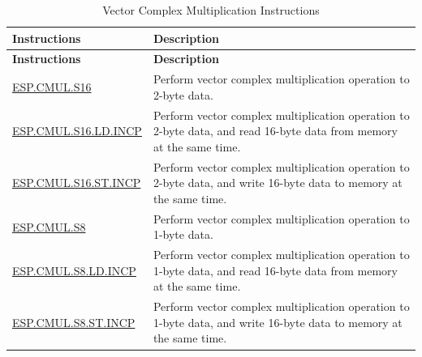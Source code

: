 \begin{longtable}[c]{|l|m{10cm}|}
    \caption{Vector Complex Multiplication Instructions}
    \label{tab:pie-complex-instructions}\\
    \hline
    \rowcolor{lightgray}
    \textbf{Instructions} & \textbf{Description} \\\hline
    \endfirsthead
    \rowcolor{lightgray}
    \textbf{Instructions} & \textbf{Description} \\\hline
    \endhead
    \endfoot
    
    \hyperref[instruction:ESPCMULS16]{ESP.CMUL.S16} & Perform vector complex multiplication operation to 2-byte data.
    \\\hline
    \hyperref[instruction:ESPCMULS16LDINCP]{ESP.CMUL.S16.LD.INCP} & Perform vector complex multiplication operation to 2-byte data, and read 16-byte data from memory at the same time.
    \\\hline
    \hyperref[instruction:ESPCMULS16STINCP]{ESP.CMUL.S16.ST.INCP} & Perform vector complex multiplication operation to 2-byte data, and write 16-byte data to memory at the same time.
    \\\hline

    \hyperref[instruction:ESPCMULS8]{ESP.CMUL.S8} & Perform vector complex multiplication operation to 1-byte data.
    \\\hline
    \hyperref[instruction:ESPCMULS8LDINCP]{ESP.CMUL.S8.LD.INCP} & Perform vector complex multiplication operation to 1-byte data, and read 16-byte data from memory at the same time.
    \\\hline
    \hyperref[instruction:ESPCMULS8STINCP]{ESP.CMUL.S8.ST.INCP} & Perform vector complex multiplication operation to 1-byte data, and write 16-byte data to memory at the same time.
    \\\hline
\end{longtable}